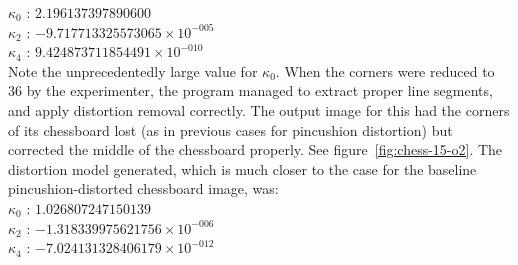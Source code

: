 \begin{enumerate}
   $ \kappa_{0}$ : $2.196137397890600$\\
   $ \kappa_{2}$ : $-9.717713325573065 \times 10^{-005}$\\
   $ \kappa_{4}$ : $9.424873711854491 \times 10^{-010}$\\
Note the unprecedentedly large value for $\kappa_{0}$. When the corners were reduced to 36 by the experimenter, the program managed to extract proper line segments, and apply distortion removal correctly. The output image for this had the corners of its chessboard lost (as in previous cases for pincushion distortion) but corrected the middle of the chessboard properly. See figure~\ref{fig:chess-15-o2}. The distortion model generated, which is much closer to the case for the baseline pincushion-distorted chessboard image, was:\\
   $ \kappa_{0}$ : $1.026807247150139$\\
   $ \kappa_{2}$ : $-1.318339975621756 \times 10^{-006}$\\
   $ \kappa_{4}$ : $-7.024131328406179 \times 10^{-012}$
\begin{figure}[H]
  \centering

\end{figure}
\end{enumerate}
